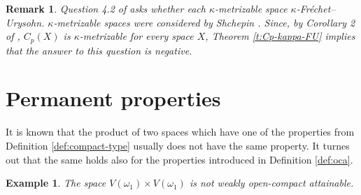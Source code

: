 \documentclass[preprint,11pt]{elsarticle}
\newtheorem{remark}[theorem]{Remark}
\newtheorem{example}[theorem]{Example}
\newtheorem{problem}[theorem]{Problem}
\numberwithin{equation}{section}
\numberwithin{theorem}{section}
\newcommand{\w}{\omega}
\newcommand{\IR}{\mathbb{R}}
\begin{document}

\begin{remark} {\em
Question 4.2 of \cite{LiL} asks whether each $\kappa$-metrizable space $\kappa$-Fr\'{e}chet--Urysohn. $\kappa$-metrizable spaces were considered by Shchepin \cite{Shchepin}. Since, by Corollary 2 of \cite{Shchepin}, $C_p(X)$ is $\kappa$-metrizable for every space $X$, Theorem \ref{t:Cp-kappa-FU} implies that the answer to this question is negative.}
\end{remark}




\section{Permanent properties} \label{sec:permanent}


It is known that the product of two spaces which have one of the properties from Definition \ref{def:compact-type} usually does not have the same property. It turnes out that the same holds also for the properties introduced in Definition \ref{def:oca}. %

\begin{example} \label{exa:square-woca}
The space $V(\w_1)\times V(\w_1)$ is not weakly open-compact attainable.
\end{example}
\end{document}
